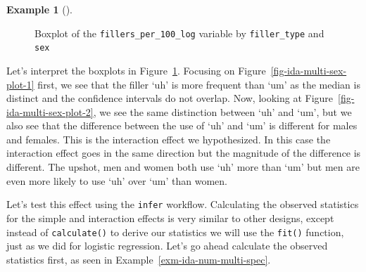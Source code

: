 \documentclass[
  letterpaper,
]{latex/krantz}
\theoremstyle{definition}
\newtheorem{example}{Example}[chapter]
\theoremstyle{remark}
\begin{document}
\begin{example}[]
\begin{figure}[H]
\begin{minipage}{0.50\linewidth}
{}


\end{minipage}%

\caption{\label{fig-ida-multi-sex-plot}Boxplot of the
\texttt{fillers\_per\_100\_log} variable by \texttt{filler\_type} and
\texttt{sex}}

\end{figure}%

\end{example}

Let's interpret the boxplots in Figure~\ref{fig-ida-multi-sex-plot}.
Focusing on Figure~\ref{fig-ida-multi-sex-plot-1} first, we see that the
filler `uh' is more frequent than `um' as the median is distinct and the
confidence intervals do not overlap. Now, looking at
Figure~\ref{fig-ida-multi-sex-plot-2}, we see the same distinction
between `uh' and `um', but we also see that the difference between the
use of `uh' and `um' is different for males and females. This is the
interaction effect we hypothesized. In this case the interaction effect
goes in the same direction but the magnitude of the difference is
different. The upshot, men and women both use `uh' more than `um' but
men are even more likely to use `uh' over `um' than women.

Let's test this effect using the \texttt{infer} workflow. Calculating
the observed statistics for the simple and interaction effects is very
similar to other designs, except instead of \texttt{calculate()} to
derive our statistics we will use the \texttt{fit()} function, just as
we did for logistic regression. Let's go ahead calculate the observed
statistics first, as seen in Example~\ref{exm-ida-num-multi-spec}.
\end{document}
